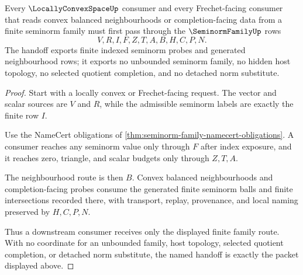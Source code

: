\begin{theorem}
\label{thm:seminorm-family-locally-convex-handoff}
Every $\LocallyConvexSpaceUp$ consumer and every Frechet-facing consumer that reads convex balanced neighbourhoods or completion-facing data from a finite seminorm family must first pass through the $\SeminormFamilyUp$ rows
$$
V,R,I,F,Z,T,A,B,H,C,P,N .
$$
The handoff exports finite indexed seminorm probes and generated neighbourhood rows; it exports no unbounded seminorm family, no hidden host topology, no selected quotient completion, and no detached norm substitute.
\end{theorem}
\begin{proof}
Start with a locally convex or Frechet-facing request. The vector and scalar sources are $V$ and $R$, while the admissible seminorm labels are exactly the finite row $I$.

Use the NameCert obligations of \autoref{thm:seminorm-family-namecert-obligations}. A consumer reaches any seminorm value only through $F$ after index exposure, and it reaches zero, triangle, and scalar budgets only through $Z,T,A$.

The neighbourhood route is then $B$. Convex balanced neighbourhoods and completion-facing probes consume the generated finite seminorm balls and finite intersections recorded there, with transport, replay, provenance, and local naming preserved by $H,C,P,N$.

Thus a downstream consumer receives only the displayed finite family route. With no coordinate for an unbounded family, host topology, selected quotient completion, or detached norm substitute, the named handoff is exactly the packet displayed above.
\end{proof}


\begin{closurestatus}{\SeminormFamilyUp}
  \theoryclosure{\seedClosure}
  \formalstatus{\unformalizedV}
\end{closurestatus}
